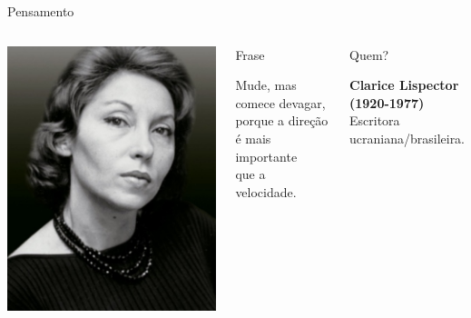 \documentclass[xcolor=dvipsnames,table]{beamer}
\begin{document}
	\begin{frame}{Pensamento}
		\begin{columns}
		  		\begin{center}
		    		\includegraphics[height=.55\textheight]{images/clarice}
		  		\end{center}
				\begin{block}{Frase}
					\begin{center}
						{\large Mude, mas comece devagar, \\porque a direção é mais importante \\que a velocidade.}
					\end{center}
				\end{block}		  		
		  		\begin{block}{Quem?}
		  			\begin{center}
						{\bf Clarice Lispector (1920-1977)} \\ Escritora ucraniana/brasileira.
					\end{center}
				\end{block}
		\end{columns}
	\end{frame}
	
\end{document}
